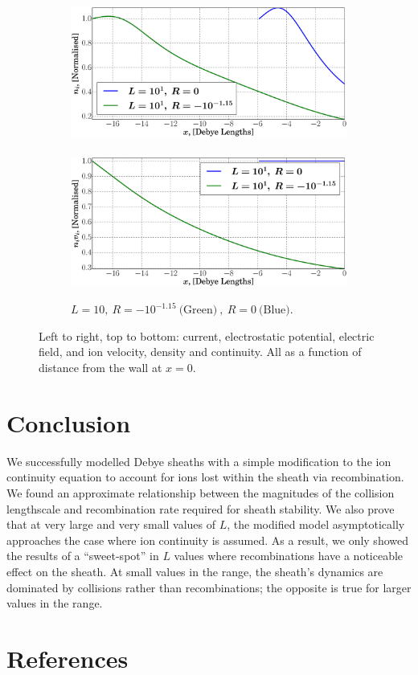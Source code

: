 \documentclass[aip,apl,reprint]{revtex4-1}
\begin{document}
\begin{figure}
\begin{subfigure}[c]{\linewidth}
			\includegraphics[width=0.44\linewidth]{4_1l.eps}
			~
			\includegraphics[width=0.44\linewidth]{6_1l.eps}
			\vspace{-0.3cm}
			\caption{$ L = 10,~ R = -10^{-1.15}~\textrm{(Green)}~,~ R = 0~\textrm{(Blue)} $.}
			\label{sf:rsltb}
		\end{subfigure}
		\vspace{-0.3cm}
		\caption{Left to right, top to bottom: current, electrostatic potential, electric field, and ion velocity, density and continuity. All as a function of distance from the wall at $x=0$.}
		\label{f:rslt}
	\end{figure}
	\clearpage
	\section{Conclusion}
	We successfully modelled Debye sheaths with a simple modification to the ion continuity equation to account for ions lost within the sheath via recombination. We found an approximate relationship between the magnitudes of the collision lengthscale and recombination rate required for sheath stability. We also prove that at very large and very small values of $L$, the modified model asymptotically approaches the case where ion continuity is assumed. As a result, we only showed the results of a ``sweet-spot'' in $L$ values where recombinations have a noticeable effect on the sheath. At small values in the range, the sheath's dynamics are dominated by collisions rather than recombinations; the opposite is true for larger values in the range.
	\section{References}
	

	
\end{document}
